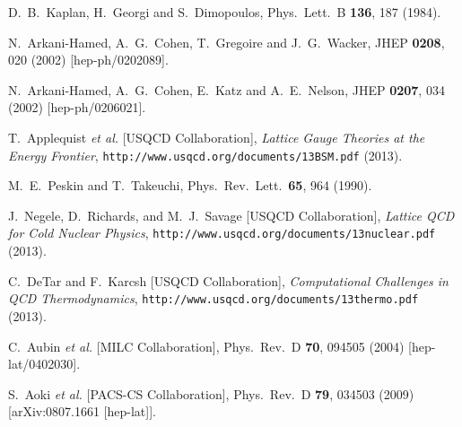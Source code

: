 \begin{thebibliography}{99}
  D.~B.~Kaplan, H.~Georgi and S.~Dimopoulos,
  Phys.\ Lett.\ B {\bf 136}, 187 (1984).
  
  N.~Arkani-Hamed, A.~G.~Cohen, T.~Gregoire and J.~G.~Wacker,
  JHEP {\bf 0208}, 020 (2002)
  [hep-ph/0202089].
  
  N.~Arkani-Hamed, A.~G.~Cohen, E.~Katz and A.~E.~Nelson,
  JHEP {\bf 0207}, 034 (2002)
  [hep-ph/0206021].

T.~Applequist {\em et al.} [USQCD Collaboration],
{\em Lattice Gauge Theories at the Energy Frontier},
{\tt http://www.usqcd.org/documents/13BSM.pdf} (2013).

  M.~E.~Peskin and T.~Takeuchi,
  Phys.\ Rev.\ Lett.\  {\bf 65}, 964 (1990).

J.~Negele, D.~Richards, and M.~J.~Savage [USQCD Collaboration],
{\em Lattice QCD for Cold Nuclear Physics},
{\tt http://www.usqcd.org/documents/13nuclear.pdf} (2013).

C.~DeTar and F.~Karcsh [USQCD Collaboration],
{\em Computational Challenges in QCD Thermodynamics},
{\tt http://www.usqcd.org/documents/13thermo.pdf} (2013).


  C.~Aubin {\it et al.} [MILC Collaboration],
  Phys.\ Rev.\ D {\bf 70}, 094505 (2004)
  [hep-lat/0402030].
  
  S.~Aoki {\it et al.}  [PACS-CS Collaboration],
  Phys.\ Rev.\ D {\bf 79}, 034503 (2009)
  [arXiv:0807.1661 [hep-lat]].
  

\end{thebibliography}
